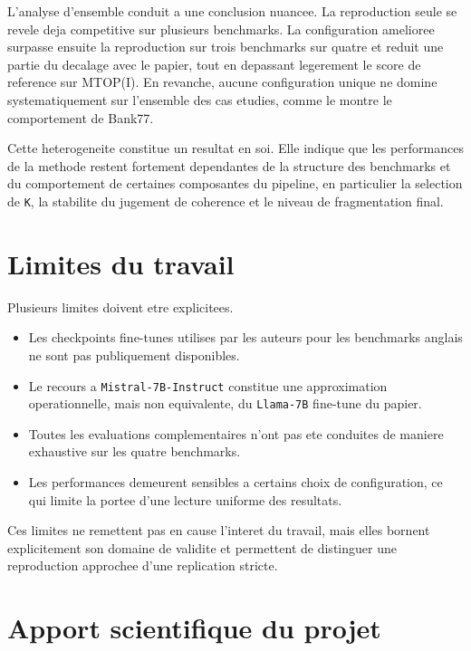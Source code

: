 L'analyse d'ensemble conduit a une conclusion nuancee. La reproduction seule se
revele deja competitive sur plusieurs benchmarks. La configuration amelioree
surpasse ensuite la reproduction sur trois benchmarks sur quatre et reduit une
partie du decalage avec le papier, tout en depassant legerement le score de
reference sur MTOP(I). En revanche, aucune configuration unique ne domine
systematiquement sur l'ensemble des cas etudies, comme le montre le comportement
de Bank77.

Cette heterogeneite constitue un resultat en soi. Elle indique que les
performances de la methode restent fortement dependantes de la structure des
benchmarks et du comportement de certaines composantes du pipeline, en
particulier la selection de \texttt{K}, la stabilite du jugement de coherence
et le niveau de fragmentation final.

\section{Limites du travail}

Plusieurs limites doivent etre explicitees.
\begin{itemize}[leftmargin=*]
  \item Les checkpoints fine-tunes utilises par les auteurs pour les benchmarks
  anglais ne sont pas publiquement disponibles.
  \item Le recours a \texttt{Mistral-7B-Instruct} constitue une approximation
  operationnelle, mais non equivalente, du \texttt{Llama-7B} fine-tune du
  papier.
  \item Toutes les evaluations complementaires n'ont pas ete conduites de
  maniere exhaustive sur les quatre benchmarks.
  \item Les performances demeurent sensibles a certains choix de configuration,
  ce qui limite la portee d'une lecture uniforme des resultats.
\end{itemize}

Ces limites ne remettent pas en cause l'interet du travail, mais elles bornent
explicitement son domaine de validite et permettent de distinguer une
reproduction approchee d'une replication stricte.

\section{Apport scientifique du projet}

